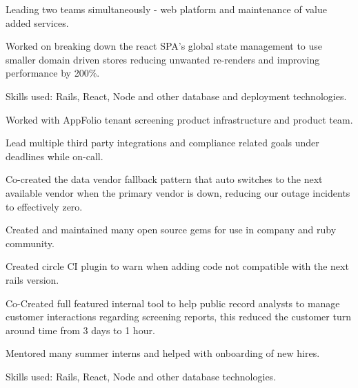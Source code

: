     \begin{tightemize}
      \item Leading two teams simultaneously - web platform and maintenance of value added services.
      \item Worked on breaking down the react SPA's global state management to use smaller domain driven stores reducing unwanted re-renders and improving performance by 200\%.
      \item Skills used: Rails, React, Node and other database and deployment technologies.
    \end{tightemize} 
    \sectionsep

    \begin{tightemize}
      \item Worked with AppFolio tenant screening product infrastructure and product team.
      \item Lead multiple third party integrations and compliance related goals under deadlines while on-call.
      \item Co-created the data vendor fallback pattern that auto switches to the next available vendor when the primary vendor is down, reducing our outage incidents to effectively zero.
      \item Created and maintained many open source gems for use in company and ruby community.
      \item Created circle CI plugin to warn when adding code not compatible with the next rails version.
      \item Co-Created full featured internal tool to help public record analysts to manage customer interactions regarding screening reports, this reduced the customer turn around time from 3 days to 1 hour.
      \item Mentored many summer interns and helped with onboarding of new hires.
      \item Skills used: Rails, React, Node and other database technologies.
    \end{tightemize} 
    \sectionsep


